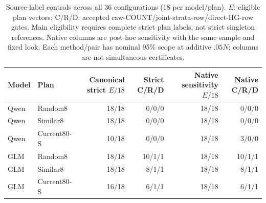 \begin{table}[t]
\centering\small
\caption{Source-label controls across all 36 configurations (18 per model/plan). $E$: eligible plan vectors; C/R/D: accepted raw-COUNT/joint-strata-row/direct-HG-row gates. Main eligibility requires complete strict plan labels, not strict singleton references. Native columns are post-hoc sensitivity with the same sample and fixed look. Each method/pair has nominal 95\% scope at additive $.05N$; columns are not simultaneous certificates.}
\label{tab:finite_results}
\begin{tabular}{llrrrr}
\toprule
Model & Plan & Canonical strict $E/18$ & Strict C/R/D & Native sensitivity $E/18$ & Native C/R/D \\
\midrule
Qwen & Random8 & 18/18 & 0/0/0 & 18/18 & 0/0/0 \\
Qwen & Similar8 & 18/18 & 0/0/0 & 18/18 & 0/0/0 \\
Qwen & Current80-S & 10/18 & 0/0/0 & 18/18 & 3/0/0 \\
\midrule
GLM & Random8 & 18/18 & 10/1/1 & 18/18 & 10/1/1 \\
GLM & Similar8 & 18/18 & 8/1/1 & 18/18 & 8/1/1 \\
GLM & Current80-S & 16/18 & 6/1/1 & 18/18 & 6/1/1 \\
\bottomrule
\end{tabular}
\end{table}
